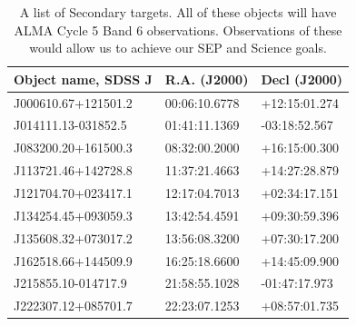  
\footnotesize 
\begin{table}
  \begin{center}
    \footnotesize 
    \begin{tabular}{|| l | l  l ||}
      \hline \hline
      Object name, SDSS J  	& R.A. (J2000) & Decl (J2000) \\
      \hline
      J000610.67+121501.2 &     00:06:10.6778 &+12:15:01.274 \\
      J014111.13-031852.5 &     01:41:11.1369 & -03:18:52.567 \\
      J083200.20+161500.3  & 08:32:00.2000 & +16:15:00.300 \\
      J113721.46+142728.8 &     11:37:21.4663 & +14:27:28.879 \\
      J121704.70+023417.1 & 12:17:04.7013 & +02:34:17.151 \\
      J134254.45+093059.3 &     13:42:54.4591 & +09:30:59.396  \\
      J135608.32+073017.2 & 13:56:08.3200 & +07:30:17.200\\
      J162518.66+144509.9 &     16:25:18.6600 & +14:45:09.900 \\
      J215855.10-014717.9 &     21:58:55.1028& -01:47:17.973 \\
      J222307.12+085701.7 & 22:23:07.1253 & +08:57:01.735\\
      \hline\hline
    \end{tabular}
    \caption{A list of Secondary targets. All of these objects will
      have ALMA Cycle 5 Band 6 observations. Observations of these would
      allow us to achieve our SEP and Science goals.}
\label{tab:backups} 
\end{center}
\end{table}
\normalsize




